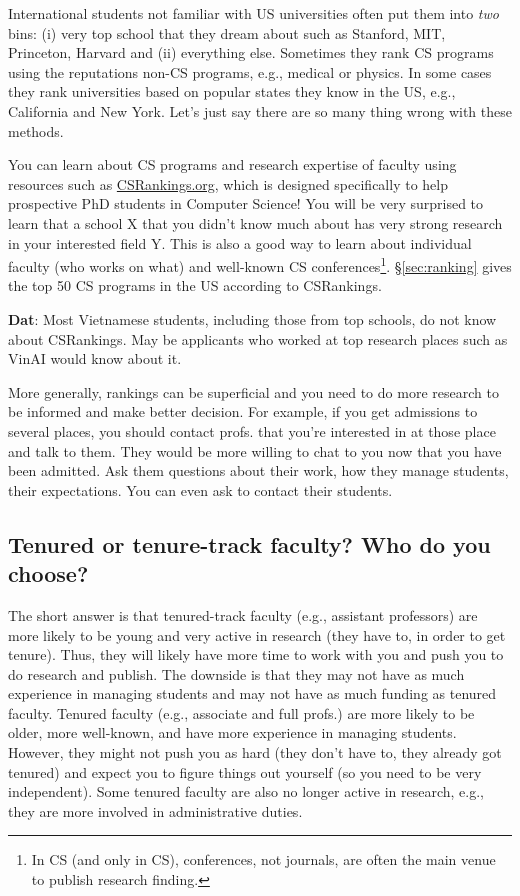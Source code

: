 \documentclass[11pt]{article}
\newenvironment{commentbox}[1][]{
\small
    \begin{cbox}
    \textbf{#1}: 
 }{
   \end{cbox}
}
\begin{document}
International students not familiar with US universities often put them into \emph{two} bins:  (i) very top school that they dream about such as Stanford, MIT, Princeton, Harvard and (ii) everything else.  Sometimes they rank CS programs using the reputations non-CS programs, e.g., medical or physics.
In some cases they rank universities based on popular states they know in the US, e.g., California and New York.  Let's just say there are so many thing wrong with these methods.

You can learn about CS programs and research expertise of faculty using resources such as \href{https://csrankings.org}{CSRankings.org}, which is designed specifically to help prospective PhD students in Computer Science!  You will be very surprised to learn that a school X that you didn't know much about has very strong research in your interested field Y. This is also a good way to learn about individual faculty (who works on what) and well-known CS conferences\footnote{In CS (and only in CS), conferences, not journals, are often the main venue to publish research finding.}. \S\ref{sec:ranking} gives the top 50 CS programs in the US according to CSRankings.
\begin{commentbox}[Dat] Most Vietnamese students, including those from top schools, do not know about CSRankings.  May be applicants who worked at top research places such as VinAI would know about it.
\end{commentbox}

More generally, rankings can be superficial and you need to do more research to be informed and make better decision. For example, if you get admissions to several places, you should contact profs. that you're interested in at those place and talk to them. They would be more willing to chat to you now that you have been admitted.  Ask them questions about their work, how they manage students, their expectations. You can even ask to contact their students.


\subsection{Tenured or tenure-track faculty? Who do you choose?} 
The short answer is that tenured-track faculty (e.g., assistant professors) are more likely to be young and very active in research (they have to, in order to get tenure). Thus, they will likely have more time to work with you and push you to do research and publish. The downside is that they may not have as much experience in managing students and may not have as much funding as tenured faculty.
Tenured faculty (e.g., associate and full profs.) are more likely to be older, more well-known, and have more experience in managing students.  However, they might not push you as hard (they don't have to, they already got tenured) and expect you to figure things out yourself (so you need to be very independent).  Some tenured faculty are also no longer active in research, e.g., they are more involved in administrative duties. 
\end{document}
